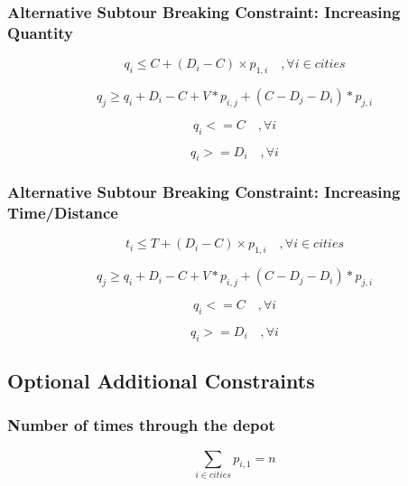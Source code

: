 \documentclass[a4paper,11pt]{article}
\begin{document}
\subsubsection{Alternative Subtour Breaking Constraint: Increasing Quantity }
\begin{equation}\label{Q}
q_{i} \leq C + (D_{i} - C) \times  p _{1,i} \quad, \forall i \in cities
\end{equation}

\begin{equation}\label{incQ}
q_{j} \geq q_{i} + D_{i} - C + V*p_{i,j}  + (C-D_{j}-D_{i})*p_{j,i}
\end{equation}

\begin{equation}
q_{i} <= C \quad, \forall i
\end{equation}

\begin{equation}
q_{i} >= D_{i} \quad, \forall i
\end{equation}


\subsubsection{Alternative Subtour Breaking Constraint: Increasing Time/Distance}
\begin{equation}\label{T}
t_{i} \leq T + (D_{i} - C) \times  p _{1,i} \quad, \forall i \in cities
\end{equation}

\begin{equation}\label{incT}
q_{j} \geq q_{i} + D_{i} - C + V*p_{i,j}  + (C-D_{j}-D_{i})*p_{j,i}
\end{equation}

\begin{equation}
q_{i} <= C \quad, \forall i
\end{equation}

\begin{equation}
q_{i} >= D_{i} \quad, \forall i
\end{equation}


\subsection{Optional Additional Constraints}
\subsubsection{Number of times through the depot}
\begin{equation}\label{eq2}
\sum\limits_{i \in cities} p_{i,1} = n
\end{equation}
\end{document}
